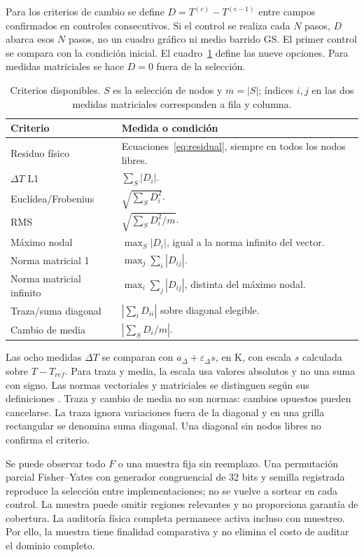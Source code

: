 \documentclass[11pt,a4paper]{article}
\begin{document}
Para los criterios de cambio se define $D=T^{(c)}-T^{(c-1)}$ entre campos confirmados en controles consecutivos. Si el control se realiza cada $N$ pasos, $D$ abarca esos $N$ pasos, no un cuadro gráfico ni medio barrido GS. El primer control se compara con la condición inicial. El cuadro~\ref{tab:criteria} define las nueve opciones. Para medidas matriciales se hace $D=0$ fuera de la selección.

\begin{table}[tbp]\centering\small
\caption{Criterios disponibles. $S$ es la selección de nodos y $m=|S|$; índices $i,j$ en las dos medidas matriciales corresponden a fila y columna.}\label{tab:criteria}
\begin{tabularx}{\linewidth}{@{}lX@{}}\toprule
Criterio & Medida o condición\\\midrule
Residuo físico & Ecuaciones~\eqref{eq:residual}, siempre en todos los nodos libres.\\
$\Delta T$ L1 & $\sum_S|D_i|$.\\
Euclídea/Frobenius & $\sqrt{\sum_SD_i^2}$.\\
RMS & $\sqrt{\sum_SD_i^2/m}$.\\
Máximo nodal & $\max_S|D_i|$, igual a la norma infinito del vector.\\
Norma matricial 1 & $\max_j\sum_i|D_{ij}|$.\\
Norma matricial infinito & $\max_i\sum_j|D_{ij}|$, distinta del máximo nodal.\\
Traza/suma diagonal & $|\sum_iD_{ii}|$ sobre diagonal elegible.\\
Cambio de media & $|\sum_SD_i/m|$.\\\bottomrule
\end{tabularx}
\end{table}

Las ocho medidas $\Delta T$ se comparan con $a_\Delta+\varepsilon_\Delta s$, en K, con escala $s$ calculada sobre $T-T_{ref}$. Para traza y media, la escala usa valores absolutos y no una suma con signo. Las normas vectoriales y matriciales se distinguen según sus definiciones \cite{numpy-norm}. Traza y cambio de media no son normas: cambios opuestos pueden cancelarse. La traza ignora variaciones fuera de la diagonal y en una grilla rectangular se denomina suma diagonal. Una diagonal sin nodos libres no confirma el criterio.

Se puede observar todo $F$ o una muestra fija sin reemplazo. Una permutación parcial Fisher--Yates con generador congruencial de 32 bits y semilla registrada reproduce la selección entre implementaciones; no se vuelve a sortear en cada control. La muestra puede omitir regiones relevantes y no proporciona garantía de cobertura. La auditoría física completa permanece activa incluso con muestreo. Por ello, la muestra tiene finalidad comparativa y no elimina el costo de auditar el dominio completo.
\end{document}
